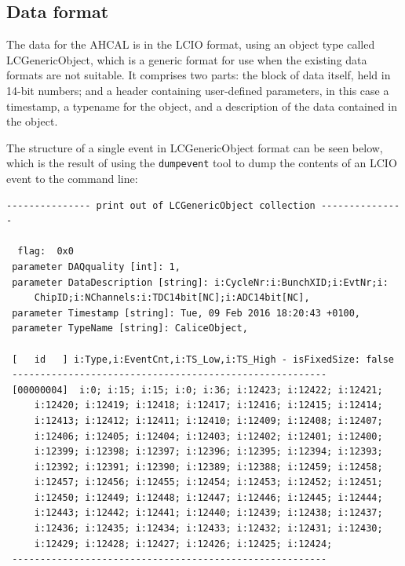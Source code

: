 \subsection{Data format}
The data for the AHCAL is in the \acrfull{LCIO} format, using an object type called LCGenericObject, which is a generic format for use when the existing data formats are not suitable. It comprises two parts: the block of data itself, held in 14-bit numbers; and a header containing user-defined parameters, in this case a timestamp, a typename for the object, and a description of the data contained in the object.

The structure of a single event in LCGenericObject format can be seen below, which is the result of using the \texttt{dumpevent} tool to dump the contents of an LCIO event to the command line:

\begin{verbatim}
--------------- print out of LCGenericObject collection --------------- 

  flag:  0x0
 parameter DAQquality [int]: 1, 
 parameter DataDescription [string]: i:CycleNr:i:BunchXID;i:EvtNr;i:
     ChipID;i:NChannels:i:TDC14bit[NC];i:ADC14bit[NC],
 parameter Timestamp [string]: Tue, 09 Feb 2016 18:20:43 +0100,
 parameter TypeName [string]: CaliceObject,

 [   id   ] i:Type,i:EventCnt,i:TS_Low,i:TS_High - isFixedSize: false
 --------------------------------------------------------
 [00000004]  i:0; i:15; i:15; i:0; i:36; i:12423; i:12422; i:12421;
     i:12420; i:12419; i:12418; i:12417; i:12416; i:12415; i:12414;
     i:12413; i:12412; i:12411; i:12410; i:12409; i:12408; i:12407;
     i:12406; i:12405; i:12404; i:12403; i:12402; i:12401; i:12400;
     i:12399; i:12398; i:12397; i:12396; i:12395; i:12394; i:12393;
     i:12392; i:12391; i:12390; i:12389; i:12388; i:12459; i:12458;
     i:12457; i:12456; i:12455; i:12454; i:12453; i:12452; i:12451;
     i:12450; i:12449; i:12448; i:12447; i:12446; i:12445; i:12444;
     i:12443; i:12442; i:12441; i:12440; i:12439; i:12438; i:12437;
     i:12436; i:12435; i:12434; i:12433; i:12432; i:12431; i:12430;
     i:12429; i:12428; i:12427; i:12426; i:12425; i:12424;
 --------------------------------------------------------
\end{verbatim}

